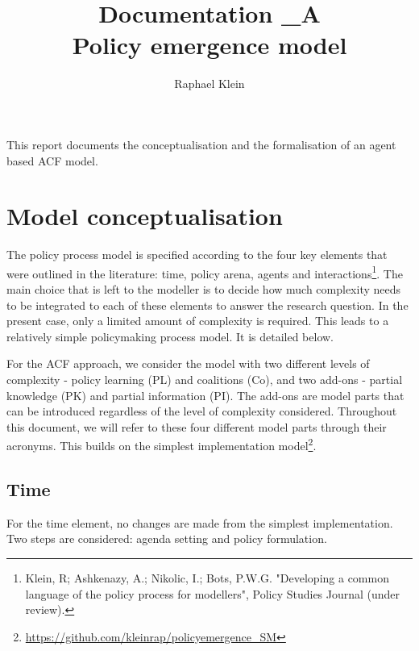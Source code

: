 \documentclass[11pt]{article}
\title{Documentation \_A \\ Policy emergence model}
\author{Raphael Klein}
\begin{document}
\maketitle


This report documents the conceptualisation and the formalisation of an agent based ACF model.

\tableofcontents

\section{Model conceptualisation}

The policy process model is specified according to the four key elements that were outlined in the literature: time, policy arena, agents and interactions\footnote{Klein, R; Ashkenazy, A.; Nikolic, I.; Bots, P.W.G. "Developing a common language of the policy process for modellers", Policy Studies Journal (under review).}. The main choice that is left to the modeller is to decide how much complexity needs to be integrated to each of these elements to answer the research question. In the present case, only a limited amount of complexity is required. This leads to a relatively simple policymaking process model. It is detailed below.

For the ACF approach, we consider the model with two different levels of complexity - policy learning (PL) and coalitions (Co), and two add-ons - partial knowledge (PK) and partial information (PI). The add-ons are model parts that can be introduced regardless of the level of complexity considered. Throughout this document, we will refer to these four different model parts through their acronyms. This builds on the simplest implementation model\footnote{\url{https://github.com/kleinrap/policyemergence_SM}}.

\subsection{Time}

For the time element, no changes are made from the simplest implementation. Two steps are considered: agenda setting and policy formulation.


\end{document}
